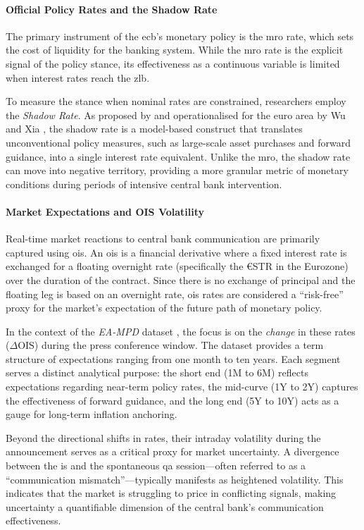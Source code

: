 \paragraph{Official Policy Rates and the Shadow Rate}
The primary instrument of the \gls{ecb}'s monetary policy is the \gls{mro} rate, which sets the cost of liquidity for the banking system. While the \gls{mro} rate is the explicit signal of the policy stance, its effectiveness as a continuous variable is limited when interest rates reach the \gls{zlb}.

To measure the stance when nominal rates are constrained, researchers employ the \emph{Shadow Rate}. As proposed by \cite{krippner2013measuring} and operationalised for the euro area by Wu and Xia \cite{wu2016measuring}, the shadow rate is a model-based construct that translates unconventional policy measures, such as large-scale asset purchases and forward guidance, into a single interest rate equivalent. Unlike the \gls{mro}, the shadow rate can move into negative territory, providing a more granular metric of monetary conditions during periods of intensive central bank intervention.

\paragraph{Market Expectations and OIS Volatility}
Real-time market reactions to central bank communication are primarily captured using \gls{ois}. An \gls{ois} is a financial derivative where a fixed interest rate is exchanged for a floating overnight rate (specifically the  €STR in the Eurozone) over the duration of the contract. Since there is no exchange of principal and the floating leg is based on an overnight rate, \gls{ois} rates are considered a ``risk-free'' proxy for the market's expectation of the future path of monetary policy.

In the context of the \emph{EA-MPD} dataset \cite{altavilla2019measuring}, the focus is on the \emph{change} in these rates ($\Delta \text{OIS}$) during the press conference window. The dataset provides a term structure of expectations ranging from one month to ten years. Each segment serves a distinct analytical purpose: the short end (1M to 6M) reflects expectations regarding near-term policy rates, the mid-curve (1Y to 2Y) captures the effectiveness of forward guidance, and the long end (5Y to 10Y) acts as a gauge for long-term inflation anchoring.

Beyond the directional shifts in rates, their intraday volatility during the announcement serves as a critical proxy for market uncertainty. A divergence between the \gls{is} and the spontaneous \gls{qa} session---often referred to as a ``communication mismatch''---typically manifests as heightened volatility. This indicates that the market is struggling to price in conflicting signals, making uncertainty a quantifiable dimension of the central bank's communication effectiveness.

